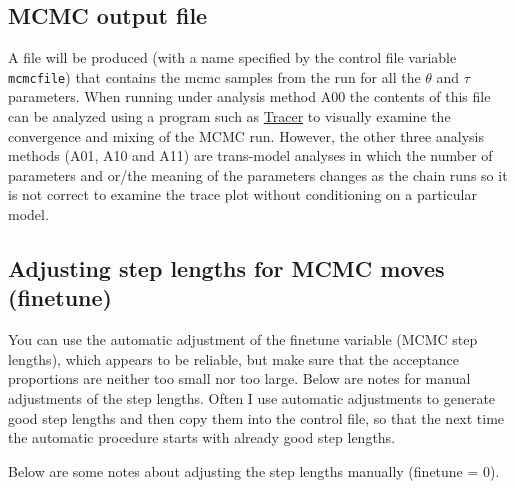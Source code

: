 \documentclass[a4paper]{book}
\numberwithin{equation}{section} \renewcommand{\baselinestretch}{0.55}
\begin{document}
\subsection{MCMC output file}
A file will be produced (with a name specified by the control file variable \texttt{mcmcfile}) that contains the mcmc samples from the run for
all the $\theta$ and $\tau$ parameters. When running under analysis method A00 the contents of this file can be analyzed using a program
such as \href{}{Tracer} to visually examine the convergence and mixing of the MCMC run. However, the other three analysis methods (A01, A10 and A11) are trans-model analyses in which the number of parameters and or/the meaning of the parameters changes as the chain runs so it is not
correct to examine the trace plot without conditioning on a particular model.

\subsection{Adjusting step lengths for MCMC moves (finetune)}

You can use the automatic adjustment of the finetune variable (MCMC
step lengths), which appears to be reliable, but make sure that the
acceptance proportions are neither too small nor too large.  Below are
notes for manual adjustments of the step lengths.  Often I use
automatic adjustments to generate good step lengths and then copy them
into the control file, so that the next time the automatic procedure
starts with already good step lengths.

Below are some notes about adjusting the step lengths manually
(finetune = 0).
\end{document}
